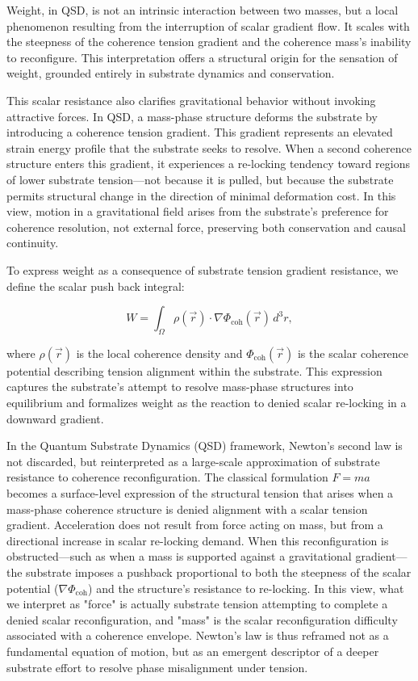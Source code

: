 \documentclass[entropy,article,submit,pdftex,moreauthors]{Definitions/mdpi}
\begin{document}
Weight, in QSD, is not an intrinsic interaction between two masses, but a local phenomenon resulting from the interruption of scalar gradient flow. It scales with the steepness of the coherence tension gradient and the coherence mass’s inability to reconfigure. This interpretation offers a structural origin for the sensation of weight, grounded entirely in substrate dynamics and conservation.

This scalar resistance also clarifies gravitational behavior without invoking attractive forces. In QSD, a mass-phase structure deforms the substrate by introducing a coherence tension gradient. This gradient represents an elevated strain energy profile that the substrate seeks to resolve. When a second coherence structure enters this gradient, it experiences a re-locking tendency toward regions of lower substrate tension—not because it is pulled, but because the substrate permits structural change in the direction of minimal deformation cost. In this view, motion in a gravitational field arises from the substrate’s preference for coherence resolution, not external force, preserving both conservation and causal continuity.

To express weight as a consequence of substrate tension gradient resistance, we define the scalar push back integral:

\begin{equation}
    W = \int_{\Omega} \rho(\vec{r}) \cdot \nabla \Phi_{\text{coh}}(\vec{r}) \, d^3r,
\end{equation}

where \( \rho(\vec{r}) \) is the local coherence density and \( \Phi_{\text{coh}}(\vec{r}) \) is the scalar coherence potential describing tension alignment within the substrate. This expression captures the substrate’s attempt to resolve mass-phase structures into equilibrium and formalizes weight as the reaction to denied scalar re-locking in a downward gradient.

In the Quantum Substrate Dynamics (QSD) framework, Newton’s second law is not discarded, but reinterpreted as a large-scale approximation of substrate resistance to coherence reconfiguration. The classical formulation \( F = ma \) becomes a surface-level expression of the structural tension that arises when a mass-phase coherence structure is denied alignment with a scalar tension gradient. Acceleration does not result from force acting on mass, but from a directional increase in scalar re-locking demand. When this reconfiguration is obstructed—such as when a mass is supported against a gravitational gradient—the substrate imposes a pushback proportional to both the steepness of the scalar potential (\( \nabla \Phi_{\text{coh}} \)) and the structure’s resistance to re-locking. In this view, what we interpret as "force" is actually substrate tension attempting to complete a denied scalar reconfiguration, and "mass" is the scalar reconfiguration difficulty associated with a coherence envelope. Newton’s law is thus reframed not as a fundamental equation of motion, but as an emergent descriptor of a deeper substrate effort to resolve phase misalignment under tension.
\end{document}
